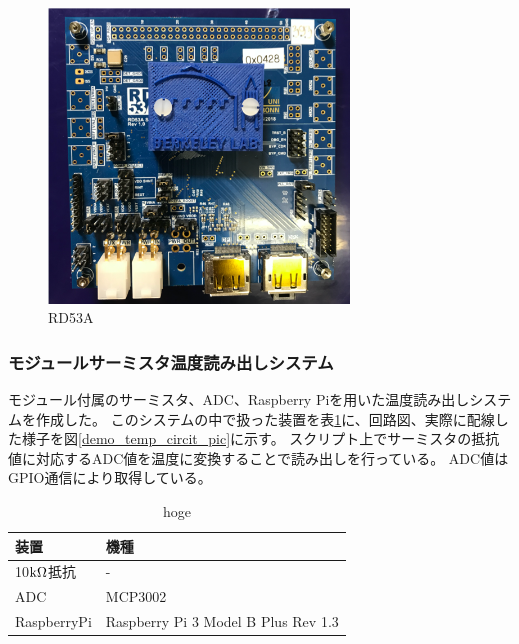\begin{figure}[h]\centering
\includegraphics[width=8cm]{rd53a_SCC}
\caption[RD53A]{RD53A}
\label{demo_rd53a_SCC}
\end{figure}

\subsubsection{モジュールサーミスタ温度読み出しシステム}
モジュール付属のサーミスタ、ADC、Raspberry Piを用いた温度読み出しシステムを作成した。
このシステムの中で扱った装置を表\ref{demo_temp_device}に、回路図、実際に配線した様子を図\ref{demo_temp_circit_pic}に示す。
スクリプト上でサーミスタの抵抗値に対応するADC値を温度に変換することで読み出しを行っている。
ADC値はGPIO通信\cite{5-9}により取得している。

\begin{table}[tbp]
\begin{center}
\caption[hoge]{hoge}
\label{demo_temp_device}
  \begin{tabular}{|ll|} \hline
    装置 & 機種 \\ \hline
    10$\rm{k\Omega}$抵抗 & - \\
    ADC & MCP3002\cite{5-3} \\  
    RaspberryPi &  Raspberry Pi 3 Model B Plus Rev 1.3\cite{5-4} \\ \hline 
  \end{tabular}
\end{center}
\end{table}

